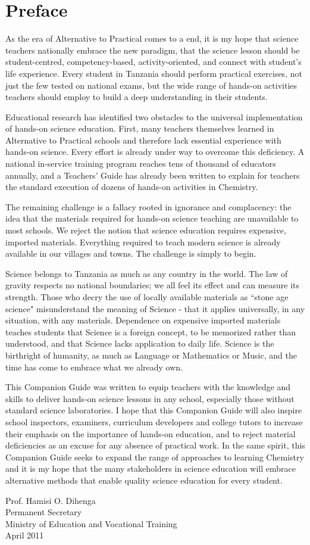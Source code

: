 \chapter*{Preface}

As the era of Alternative to Practical comes to a end, it is my hope that science teachers nationally embrace the new paradigm, that the science lesson should be student-centred, competency-based, activity-oriented, and connect with student's life experience. Every student in Tanzania should perform practical exercises, not just the few tested on national exams, but the wide range of hands-on activities teachers should employ to build a deep understanding in their students.

Educational research has identified two obstacles to the universal implementation of hands-on science education. First, many teachers themselves learned in Alternative to Practical schools and therefore lack essential experience with hands-on science. Every effort is already under way to overcome this deficiency. A national in-service training program reaches tens of thousand of educators annually, and a Teachers' Guide has already been written to explain for teachers the standard execution of dozens of hands-on activities in Chemistry.

The remaining challenge is a fallacy rooted in ignorance and complacency: the idea that the materials required for hands-on science teaching are unavailable to most schools. We reject the notion that science education requires expensive, imported materials. Everything required to teach modern science is already available in our villages and towns. The challenge is simply to begin.

Science belongs to Tanzania as much as any country in the world. The law of gravity respects no national boundaries; we all feel its effect and can measure its strength. Those who decry the use of locally available materials as ``stone age science" misunderstand the meaning 
of Science - that it applies universally, in any situation, with any materials. Dependence on expensive imported materials teaches students that Science is a foreign concept, to be memorized rather than understood, and that Science lacks application to daily life. Science is the birthright of humanity, as much as Language or Mathematics or Music, and the time has come to embrace what we already own.

This Companion Guide was written to equip teachers with the knowledge and skills to deliver hands-on science lessons in any school, especially those without standard science laboratories. I hope that this Companion Guide will also inspire school inspectors, examiners, curriculum developers and college tutors to increase their emphasis on the importance of hands-on education, and to reject material deficiencies as an excuse for any absence of practical work. In the same spirit, this Companion Guide seeks to expand the range of approaches to learning Chemistry and it is my hope that the many stakeholders in science education will embrace alternative methods that enable quality science education for every student.

Prof. Hamisi O. Dihenga\\
Permanent Secretary\\
Ministry of Education and Vocational Training\\
April 2011
